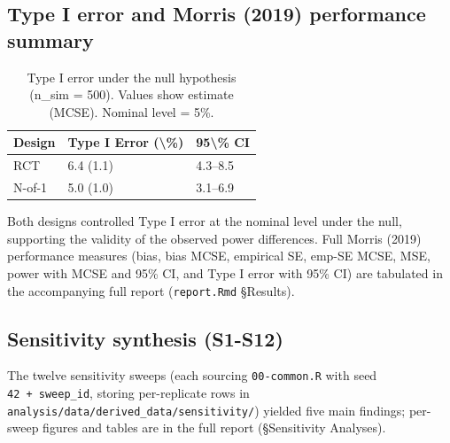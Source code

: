 \documentclass[
  11pt,
]{article}
\begin{document}
\subsection{Type I error and Morris (2019) performance
summary}\label{type-i-error-and-morris-2019-performance-summary}

\begin{longtable}[t]{lll}
\caption{\label{tab:type-i-error}Type I error under the null hypothesis (n\_sim = 500). Values show estimate (MCSE). Nominal level = 5\%.}\\
\toprule
Design & Type I Error (\textbackslash{}\%) & 95\textbackslash{}\% CI\\
\midrule
RCT & 6.4 (1.1) & 4.3--8.5\\
N-of-1 & 5.0 (1.0) & 3.1--6.9\\
\bottomrule
\end{longtable}

Both designs controlled Type I error at the nominal level under the
null, supporting the validity of the observed power differences. Full
Morris (2019) performance measures (bias, bias MCSE, empirical SE,
emp-SE MCSE, MSE, power with MCSE and 95\% CI, and Type I error with
95\% CI) are tabulated in the accompanying full report
(\texttt{report.Rmd} §Results).

\subsection{Sensitivity synthesis
(S1-S12)}\label{sensitivity-synthesis-s1-s12}

The twelve sensitivity sweeps (each sourcing \texttt{00-common.R} with
seed \texttt{42\ +\ sweep\_id}, storing per-replicate rows in
\texttt{analysis/data/derived\_data/sensitivity/}) yielded five main
findings; per-sweep figures and tables are in the full report
(§Sensitivity Analyses).
\end{document}
